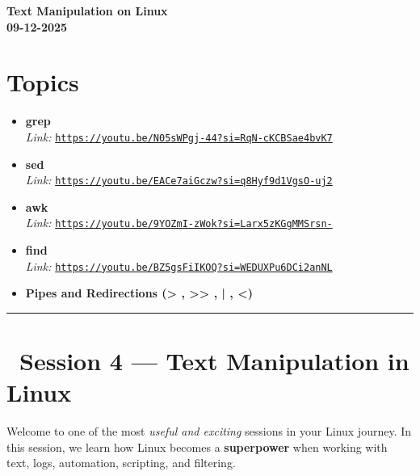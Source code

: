 \documentclass[12pt]{article}
\newcommand{\courseTitle}{Text Manipulation on Linux}
\newcommand{\courseDate}{09-12-2025}
\newcommand{\threadicon}{\faLink}
\begin{document}
\begin{center}
\headingfont\Huge\bfseries\color{navy}
\courseTitle\\[0.5em]
\Large\color{teamred}
\courseDate
\end{center}

\section*{Topics}

\begin{itemize}
    \item \textbf{grep}
          \\\emph{Link:} \href{https://youtu.be/N05sWPgj-44?si=RqN-cKCBSae4bvK7}{\texttt{https://youtu.be/N05sWPgj-44?si=RqN-cKCBSae4bvK7}}
    
    \item \textbf{sed}
          \\\emph{Link:} \href{https://youtu.be/EACe7aiGczw?si=q8Hyf9d1VgsO-uj2}{\texttt{https://youtu.be/EACe7aiGczw?si=q8Hyf9d1VgsO-uj2}}
    
    \item \textbf{awk}
          \\\emph{Link:} \href{https://youtu.be/9YOZmI-zWok?si=Larx5zKGgMMSrsn-}{\texttt{https://youtu.be/9YOZmI-zWok?si=Larx5zKGgMMSrsn-}}
    
    \item \textbf{find}
          \\\emph{Link:} \href{https://youtu.be/BZ5gsFiIKOQ?si=WEDUXPu6DCi2anNL}{\texttt{https://youtu.be/BZ5gsFiIKOQ?si=WEDUXPu6DCi2anNL}}
    
    \item \textbf{Pipes and Redirections (> , >> , | , <)}
\end{itemize}

\vspace{1em}
\begin{center}
\color{teamred}\rule{0.8\textwidth}{1pt}
\end{center}

\section*{\threadicon\ Session 4 — Text Manipulation in Linux}

Welcome to one of the most \textit{useful and exciting} sessions in your Linux journey.
In this session, we learn how Linux becomes a \textbf{superpower} when working with text, logs, automation, scripting, and filtering.
\end{document}

